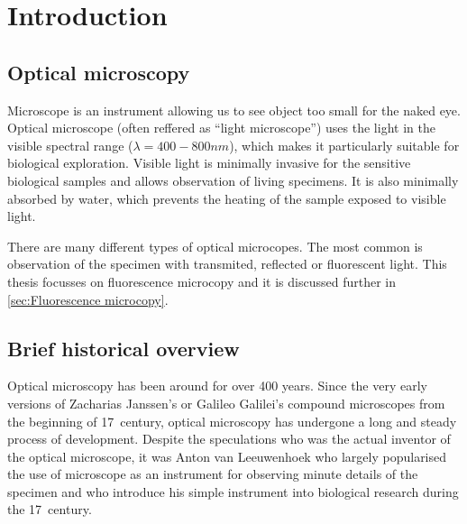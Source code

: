 \chapter{Introduction}


\section{Optical microscopy}

Microscope is an instrument allowing us to see object too small for the naked eye. Optical microscope (often reffered as ``light microscope'') uses the light in the visible spectral range ($\lambda=400-800\unit{nm}$), which makes it particularly suitable for biological exploration. Visible light is minimally invasive for the sensitive biological samples and allows observation of living specimens. It is also minimally absorbed by water, which prevents the heating of the sample exposed to visible light.

There are many different types of optical microcopes. The most common is observation of the specimen with transmited, reflected or fluorescent light. This thesis focusses on fluorescence microcopy and it is discussed further in \autoref{sec:Fluorescence microcopy}.


\section{Brief historical overview}

Optical microscopy has been around for over 400 years. Since the very early versions of Zacharias Janssen's or Galileo Galilei's compound microscopes from the beginning of 17\ths\ century, optical microscopy has undergone a long and steady process of development. Despite the speculations who was the actual inventor of the optical microscope, it was Anton van Leeuwenhoek who largely popularised the use of microscope as an instrument for observing minute details of the specimen and who introduce his simple instrument into biological research during the 17\ths\ century. 

